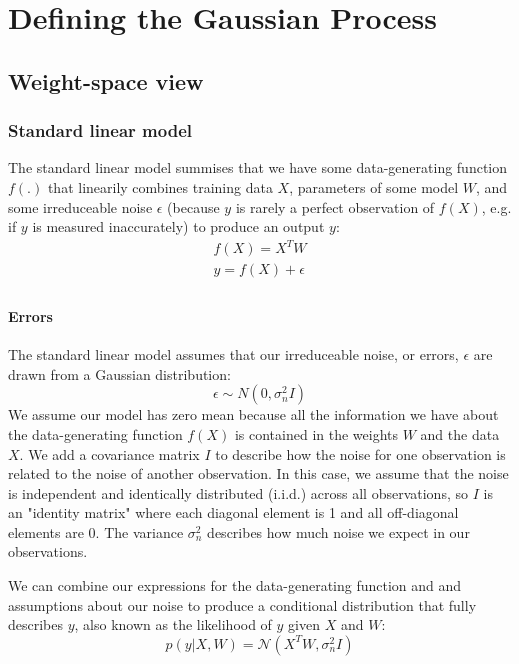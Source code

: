 \section{Defining the Gaussian Process}

\subsection{Weight-space view}

\subsubsection{Standard linear model}
The standard linear model summises that we have some data-generating function $f(.)$ that linearily combines training data $X$, parameters of some model $W$, and some irreduceable noise $\epsilon$ (because $y$ is rarely a perfect observation of $f(X)$, e.g. if $y$ is measured inaccurately) to produce an output $y$:
\begin{equation} \label{eq:linear_model}
    \begin{aligned}
        f(X) = X^T W \\
        y = f(X) + \epsilon \\
    \end{aligned}
\end{equation}

\paragraph{Errors}
 The standard linear model assumes that our irreduceable noise, or errors, $\epsilon$ are drawn from a Gaussian distribution:
\begin{equation} \label{eq:model_error_assumption}
    \epsilon \sim N(0, \sigma_n^2I)
\end{equation}
We assume our model has zero mean because all the information we have about the data-generating function $f(X)$ is contained in the weights $W$ and the data $X$. We add a covariance matrix $I$ to describe how the noise for one observation is related to the noise of another observation. In this case, we assume that the noise is independent and identically distributed (i.i.d.) across all observations, so $I$ is an "identity matrix" where each diagonal element is 1 and all off-diagonal elements are 0. The variance $\sigma_n^2$ describes how much noise we expect in our observations.

We can combine our expressions for the data-generating function and and assumptions about our noise to produce a conditional distribution that fully describes $y$, also known as the likelihood of $y$ given $X$ and $W$:
\begin{equation*}
    p(y|X,W) = \mathcal{N}(X^TW, \sigma^2_nI)
\end{equation*}

